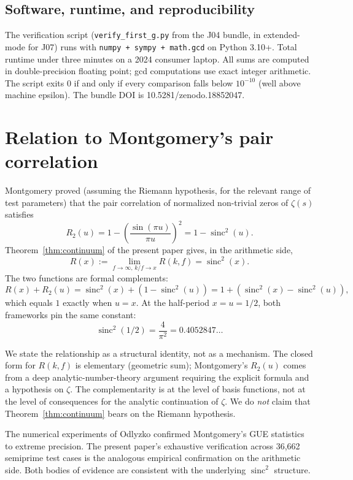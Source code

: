 \documentclass[11pt,reqno]{amsart}
\theoremstyle{plain}
\theoremstyle{definition}
\theoremstyle{remark}
\DeclareMathOperator{\sinc}{sinc}
\begin{document}
\subsection{Software, runtime, and reproducibility}

The verification script (\texttt{verify\_first\_g.py} from the
J04 bundle, in extended-mode for J07) runs with \texttt{numpy +
sympy + math.gcd} on Python 3.10+. Total runtime under three
minutes on a 2024 consumer laptop. All sums are computed in
double-precision floating point; gcd computations use exact integer
arithmetic. The script exits 0 if and only if every comparison
falls below $10^{-10}$ (well above machine epsilon). The bundle
DOI is 10.5281/zenodo.18852047.

\section{Relation to Montgomery's pair correlation}
\label{sec:montgomery}

Montgomery \cite{Montgomery1973} proved (assuming the Riemann
hypothesis, for the relevant range of test parameters) that the
pair correlation of normalized non-trivial zeros of $\zeta(s)$
satisfies
\[
  R_2(u) = 1 - \left(\frac{\sin(\pi u)}{\pi u}\right)^2 = 1 - \sinc^2(u).
\]
Theorem~\ref{thm:continuum} of the present paper gives, in the
arithmetic side,
\[
  R(x) := \lim_{f \to \infty,\, k/f \to x} R(k, f) = \sinc^2(x).
\]
The two functions are formal complements:
\[
  R(x) + R_2(u) = \sinc^2(x) + (1 - \sinc^2(u))
  = 1 + (\sinc^2(x) - \sinc^2(u)),
\]
which equals $1$ exactly when $u = x$. At the half-period $x = u = 1/2$,
both frameworks pin the same constant:
\[
  \sinc^2(1/2) = \frac{4}{\pi^2} = 0.4052847\ldots
\]

We state the relationship as a structural identity, not as a
mechanism. The closed form for $R(k, f)$ is elementary
(geometric sum); Montgomery's $R_2(u)$ comes from a deep
analytic-number-theory argument requiring the explicit formula
and a hypothesis on $\zeta$. The complementarity is at the level
of basis functions, not at the level of consequences for the
analytic continuation of $\zeta$. We do \emph{not} claim that
Theorem~\ref{thm:continuum} bears on the Riemann hypothesis.

The numerical experiments of Odlyzko \cite{Odlyzko1987,
Odlyzko1992} confirmed Montgomery's GUE statistics to extreme
precision. The present paper's exhaustive verification across
36{,}662 semiprime test cases is the analogous empirical
confirmation on the arithmetic side. Both bodies of evidence are
consistent with the underlying $\sinc^2$ structure.
\end{document}
